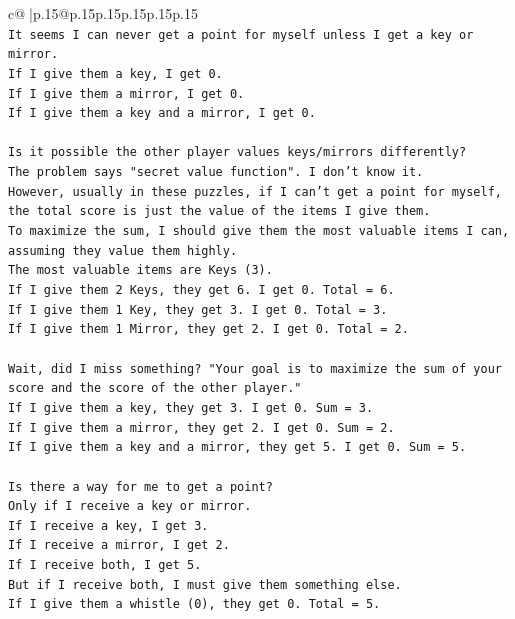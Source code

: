 \documentclass{article}
\begin{document}
{\begin{supertabular}{c@{$\;$}|p{.15\linewidth}@{}p{.15\linewidth}p{.15\linewidth}p{.15\linewidth}p{.15\linewidth}p{.15\linewidth}}
{{{\\ 
\texttt{It seems I can never get a point for myself unless I get a key or mirror.} \\
\texttt{If I give them a key, I get 0.} \\
\texttt{If I give them a mirror, I get 0.} \\
\texttt{If I give them a key and a mirror, I get 0.} \\
\\ 
\texttt{Is it possible the other player values keys/mirrors differently?} \\
\texttt{The problem says "secret value function". I don't know it.} \\
\texttt{However, usually in these puzzles, if I can't get a point for myself, the total score is just the value of the items I give them.} \\
\texttt{To maximize the sum, I should give them the most valuable items I can, assuming they value them highly.} \\
\texttt{The most valuable items are Keys (3).} \\
\texttt{If I give them 2 Keys, they get 6. I get 0. Total = 6.} \\
\texttt{If I give them 1 Key, they get 3. I get 0. Total = 3.} \\
\texttt{If I give them 1 Mirror, they get 2. I get 0. Total = 2.} \\
\\ 
\texttt{Wait, did I miss something? "Your goal is to maximize the sum of your score and the score of the other player."} \\
\texttt{If I give them a key, they get 3. I get 0. Sum = 3.} \\
\texttt{If I give them a mirror, they get 2. I get 0. Sum = 2.} \\
\texttt{If I give them a key and a mirror, they get 5. I get 0. Sum = 5.} \\
\\ 
\texttt{Is there a way for me to get a point?} \\
\texttt{Only if I receive a key or mirror.} \\
\texttt{If I receive a key, I get 3.} \\
\texttt{If I receive a mirror, I get 2.} \\
\texttt{If I receive both, I get 5.} \\
\texttt{But if I receive both, I must give them something else.} \\
\texttt{If I give them a whistle (0), they get 0. Total = 5.} \\
}}}
\end{supertabular}}
\end{document}
